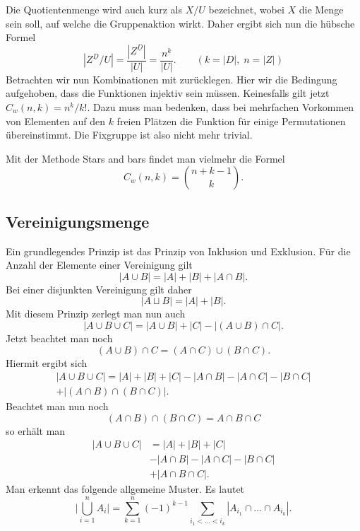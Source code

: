 \documentclass[a4paper,12pt,fleqn,twoside]{article}
\begin{document}
Die Quotientenmenge wird auch kurz als $X/U$ bezeichnet,
wobei $X$ die Menge sein soll, auf welche die Gruppenaktion wirkt.
Daher ergibt sich nun die hübsche Formel
\begin{equation}
|Z^{\underline D}/U| = \frac{|Z^{\underline D}|}{|U|}
= \frac{n^{\underline k}}{|U|}.\qquad(k=|D|,\;n=|Z|)
\end{equation}
%
Betrachten wir nun Kombinationen mit zurücklegen.
Hier wir die Bedingung aufgehoben, dass die Funktionen injektiv
sein müssen. Keinesfalls gilt jetzt $C_w(n,k)=n^k/k!$. Dazu
muss man bedenken, dass bei mehrfachen Vorkommen von Elementen
auf den $k$ freien Plätzen die Funktion für einige Permutationen
übereinstimmt. Die Fixgruppe ist also nicht mehr trivial.

Mit der Methode {\glqq}Stars and bars{\grqq} findet man vielmehr
die Formel
\begin{equation}
C_w(n,k) = \binom{n+k-1}{k}.
\end{equation}

\subsection{Vereinigungsmenge}
Ein grundlegendes Prinzip ist das Prinzip von Inklusion und
Exklusion. Für die Anzahl der Elemente einer Vereinigung
gilt
\begin{equation}
|A\cup B| = |A|+|B|+|A\cap B|.
\end{equation}
Bei einer disjunkten Vereinigung gilt daher
\[|A\sqcup B| = |A|+|B|.\]
Mit diesem Prinzip zerlegt man nun auch
\[|A\cup B\cup C| = |A\cup B|+|C|-|(A\cup B)\cap C|.\]
Jetzt beachtet man noch
\[(A\cup B)\cap C = (A\cap C)\cup(B\cap C).\]
Hiermit ergibt sich
\begin{gather*}
|A\cup B\cup C| = |A|+|B|+|C|-|A\cap B|-|A\cap C|-|B\cap C|\\
+|(A\cap B)\cap (B\cap C)|.
\end{gather*}
Beachtet man nun noch
\[(A\cap B)\cap (B\cap C) = A\cap B\cap C\]
so erhält man
\begin{equation}
\begin{split}
|A\cup B\cup C| &= |A|+|B|+|C|\\
&-|A\cap B|-|A\cap C|-|B\cap C|\\
&+|A\cap B\cap C|.
\end{split}
\end{equation}
Man erkennt das folgende allgemeine Muster. Es lautet
\begin{equation}
\bigg|\bigcup_{i=1}^n A_i\bigg|
= \sum_{k=1}^n (-1)^{k-1} \sum_{i_1<\ldots<i_k}
|A_{i_1}\cap\ldots\cap A_{i_k}|.
\end{equation}
\end{document}
